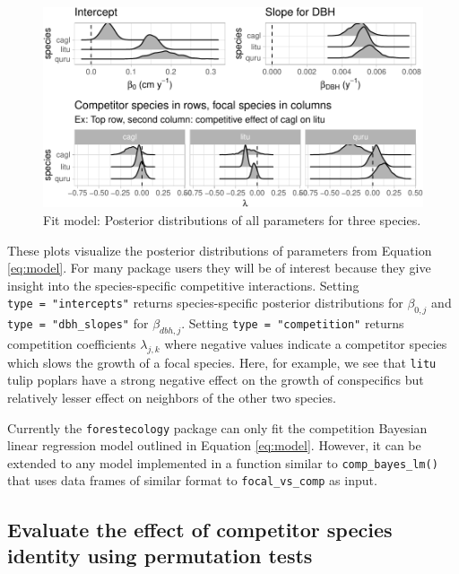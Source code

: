 \documentclass[12pt]{article}
\begin{document}
\begin{figure}

{\centering \includegraphics[width=1\linewidth]{Figures/scbi-posterior-viz-1} 

}

\caption{Fit model: Posterior distributions of all parameters for three species.}\label{fig:scbi-posterior-viz}
\end{figure}

These plots visualize the posterior distributions of parameters from
Equation \ref{eq:model}. For many package users they will be of interest
because they give insight into the species-specific competitive
interactions. Setting \texttt{type\ =\ "intercepts"} returns
species-specific posterior distributions for \(\beta_{0,j}\) and
\texttt{type\ =\ "dbh\_slopes"} for \(\beta_{dbh,j}\). Setting
\texttt{type\ =\ "competition"} returns competition coefficients
\(\lambda_{j,k}\) where negative values indicate a competitor species
which slows the growth of a focal species. Here, for example, we see
that \texttt{litu} tulip poplars have a strong negative effect on the
growth of conspecifics but relatively lesser effect on neighbors of the
other two species.

Currently the \texttt{forestecology} package can only fit the
competition Bayesian linear regression model outlined in Equation
\ref{eq:model}. However, it can be extended to any model implemented in
a function similar to \texttt{comp\_bayes\_lm()} that uses data frames
of similar format to \texttt{focal\_vs\_comp} as input.

\hypertarget{evaluate-the-effect-of-competitor-species-identity-using-permutation-tests}{%
\subsection{Evaluate the effect of competitor species identity using
permutation
tests}\label{evaluate-the-effect-of-competitor-species-identity-using-permutation-tests}}
\end{document}
